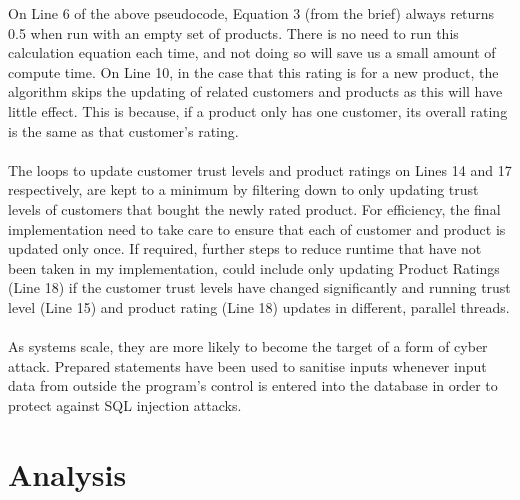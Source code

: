 \documentclass{article}
\begin{document}
On Line 6 of the above pseudocode, Equation 3 (from the brief) always returns 0.5 when run with an empty set of products. There is no need to run this calculation equation each time, and not doing so will save us a small amount of compute time. On Line 10, in the case that this rating is for a new product, the algorithm skips the updating of related customers and products as this will have little effect. This is because, if a product only has one customer, its overall rating is the same as that customer's rating.
\\\\
The loops to update customer trust levels and product ratings on Lines 14 and 17 respectively, are kept to a minimum by filtering down to only updating trust levels of customers that bought the newly rated product. For efficiency, the final implementation need to take care to ensure that each of customer and product is updated only once. If required, further steps to reduce runtime that have not been taken in my implementation, could include only updating Product Ratings (Line 18) if the customer trust levels have changed significantly and running trust level (Line 15) and product rating (Line 18) updates in different, parallel threads.
\\\\
As systems scale, they are more likely to become the target of a form of cyber attack. Prepared statements have been used to sanitise inputs whenever input data from outside the program's control is entered into the database in order to protect against SQL injection attacks.

\section{Analysis} %
\label{analysis}
\end{document}
